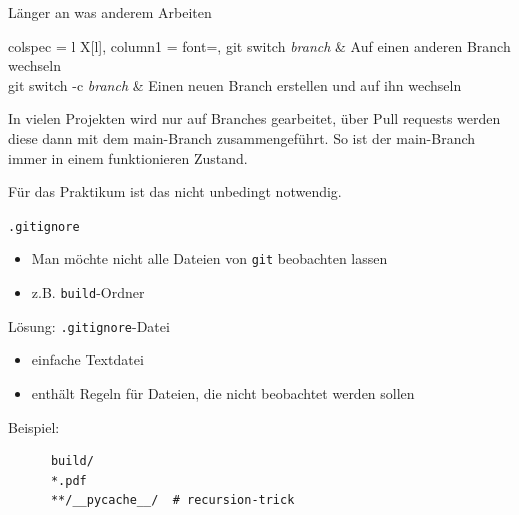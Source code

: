 \begin{frame}{Länger an was anderem Arbeiten}
  \begin{tblr}{
      colspec = {l X[l]},
      column{1} = {font=\ttfamily},
    }
    git switch \textit{branch} & Auf einen anderen Branch wechseln \\
    git switch -c \textit{branch} & Einen neuen Branch erstellen und auf ihn wechseln
  \end{tblr}

  \vspace{2em}
  In vielen Projekten wird nur auf Branches gearbeitet, 
  über Pull requests werden diese dann mit dem main-Branch zusammengeführt.
  So ist der main-Branch immer in einem funktionieren Zustand.
  
  Für das Praktikum ist das nicht unbedingt notwendig.
\end{frame}

\begin{frame}[fragile]{\texttt{.gitignore}}
    \begin{itemize}
    \item Man möchte nicht alle Dateien von \texttt{git} beobachten lassen
    \item z.B. \texttt{build}-Ordner
    \end{itemize}
    \begin{center}
        \Large Lösung: \texttt{.gitignore}-Datei
    \end{center}

    \begin{itemize}
    \item einfache Textdatei
    \item enthält Regeln für Dateien, die nicht beobachtet werden sollen
    \end{itemize}
    Beispiel:
    \vspace{1em}
    \begin{verbatim}
      build/
      *.pdf
      **/__pycache__/  # recursion-trick
    \end{verbatim}
\end{frame}

